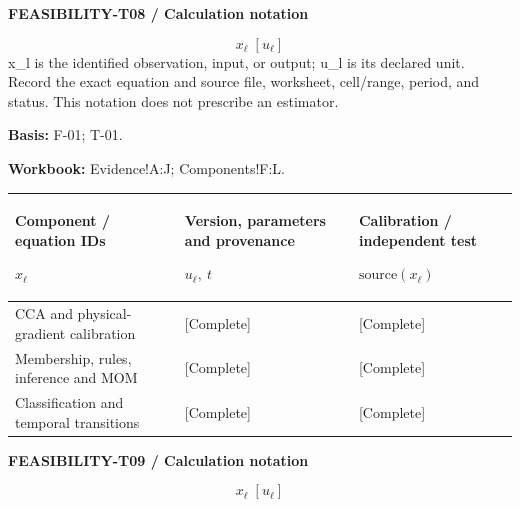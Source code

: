 \textbf{FEASIBILITY-T08 / Calculation notation}\par
{\fontsize{9}{11}\selectfont\[ x_{\ell}\;[u_{\ell}] \]}
x\_l is the identified observation, input, or output; u\_l is its declared unit. Record the exact equation and source file, worksheet, cell/range, period, and status. This notation does not prescribe an estimator.\par
\textbf{Basis:} F-01; T-01.\par
\textbf{Workbook:} Evidence!A:J; Components!F:L.\par\endgroup
{\sffamily\fontsize{8.3}{10.3}\selectfont\begin{longtable}{@{}P{61.14mm} P{54.44mm} P{49.49mm}@{}}
\toprule
\textbf{Component / equation IDs}\par {\normalfont\fontsize{8.2}{10}\selectfont $x_{\ell}$} & \textbf{Version, parameters and provenance}\par {\normalfont\fontsize{8.2}{10}\selectfont $u_{\ell},\ t$} & \textbf{Calibration / independent test}\par {\normalfont\fontsize{8.2}{10}\selectfont $\text{source}(x_{\ell})$}\\\midrule\endhead
\rule{0pt}{7.7mm}CCA and physical-gradient calibration & [Complete] & [Complete]\\\hline
\rule{0pt}{7.7mm}Membership, rules, inference and MOM & [Complete] & [Complete]\\\hline
\rule{0pt}{7.7mm}Classification and temporal transitions & [Complete] & [Complete]\\\hline
\end{longtable}}
\par\begingroup\sffamily\fontsize{8}{10}\selectfont\color{NEBGreen}\setlength{\parskip}{2pt}\setlength{\abovedisplayskip}{4pt}\setlength{\belowdisplayskip}{4pt}\setlength{\abovedisplayshortskip}{2pt}\setlength{\belowdisplayshortskip}{3pt}
\textbf{FEASIBILITY-T09 / Calculation notation}\par
{\fontsize{9}{11}\selectfont\[ x_{\ell}\;[u_{\ell}] \]}
